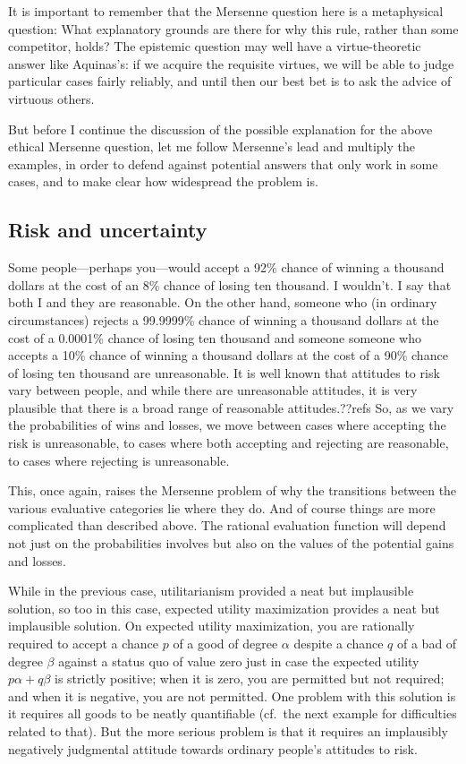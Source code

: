 It is important to remember that the Mersenne question here is a metaphysical question: What explanatory grounds are there for why this
rule, rather than some competitor, holds? The epistemic question may well have a virtue-theoretic answer like Aquinas's: if
we acquire the requisite virtues, we will be able to judge particular cases fairly reliably, and until then our best bet is
to ask the advice of virtuous others.

But before I continue the discussion of the possible explanation for the above ethical Mersenne question, let me follow
Mersenne's lead and multiply the examples, in order to defend against potential answers that only work in some cases, and
to make clear how widespread the problem is.

\subsection{Risk and uncertainty}
Some people---perhaps you---would accept a 92\% chance of winning a thousand dollars at the cost of an 8\% chance
of losing ten thousand. I wouldn't. I say that both I and they are reasonable. On the other hand, someone who 
(in ordinary circumstances) rejects a 99.9999\% chance of winning a thousand dollars at the cost of a 0.0001\% chance
of losing ten thousand and someone someone who accepts a 10\% chance of winning a thousand dollars at the cost of a 90\% chance
of losing ten thousand are unreasonable. 
It is well known that attitudes to risk vary between people, and while there are unreasonable attitudes, it is very plausible
that there is a broad range of reasonable attitudes.??refs
So, as we vary the probabilities of wins and losses, we move between cases
where accepting the risk is unreasonable, to cases where both accepting and rejecting are reasonable, to cases where
rejecting is unreasonable.

This, once again, raises the Mersenne problem of why the transitions between the various evaluative categories lie where they
do.  And of course things are more complicated than described above. The rational evaluation function will depend not just
on the probabilities involves but also on the values of the potential gains and losses. 

While in the previous case, utilitarianism provided a neat but implausible solution, so too in this case, expected utility
maximization provides a neat but implausible solution. On expected utility maximization, you are rationally required to
accept a chance $p$ of a good of degree $\alpha$ despite a chance $q$ of a bad of degree $\beta$ against a status quo of
value zero just in case the
expected utility $p\alpha + q\beta$ is strictly positive; when it is zero, you are permitted but not required; 
and when it is negative, you are not permitted. One problem with this solution is it requires all goods to be neatly
quantifiable (cf.\ the next example for difficulties related to that). But the more serious problem is that it requires an
implausibly negatively judgmental attitude towards ordinary people's attitudes to risk.

